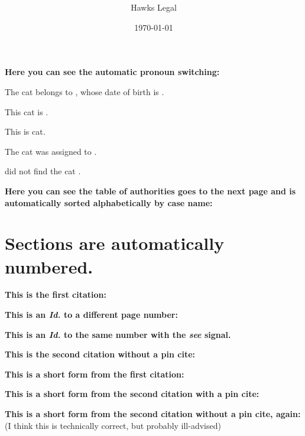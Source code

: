 \documentclass[12pt]{article}
\title{\large\bfseries\centering\MotionTitle}
\author{Hawks Legal}
\date{\mydate\today}
\begin{document}
\raggedbottom
\maketitle
\thispagestyle{fancy}
\raggedright{}
\setlength\parindent{2.5pc}


\noindent\textbf{Here you can see the automatic pronoun switching:}
\vspace{2em}

The cat belongs to \clientname{}, whose date of birth is \clientdob{}. 

This cat is \theirs{}.

This is \their{} cat.

The cat was assigned to \them{}.

\They{} did not find the cat \themselves{}.
\vspace{2em}

\noindent\textbf{Here you can see the table of authorities goes to the next page and is automatically sorted alphabetically by case name:}

\clearpage
\printbibliography
\clearpage

\section{Sections are automatically numbered.}

\textbf{This is the first citation:}\\
\cite[413]{Northland2020}

\textbf{This is an \emph{Id.} to a different page number:}\\
\cite[412]{Northland2020}

\textbf{This is an \emph{Id.} to the same number with the \emph{see} signal.}\\
\cite[See][412]{Northland2020}

\textbf{This is the second citation without a pin cite:}\\
\cite{Gordon2000}

\textbf{This is a short form from the first citation:}\\
\cite[412]{Northland2020}

\textbf{This is a short form from the second citation with a pin cite:}\\
\cite[130]{Gordon2000}

\textbf{This is a short form from the second citation without a pin cite, again:}\\
\cite{Gordon2000} (I think this is technically correct, but probably ill-advised)
\end{document}
